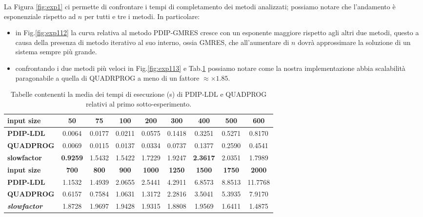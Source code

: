 La Figura \ref{fig:exp1} ci permette di confrontare i tempi di completamento dei metodi analizzati; possiamo notare che l'andamento è esponenziale rispetto ad $n$ per tutti e tre i metodi.
In particolare:
\begin{itemize}
    \item in Fig.\ref{fig:exp112} la curva relativa al metodo PDIP-GMRES cresce con un esponente maggiore rispetto agli altri due metodi, questo a causa della presenza di metodo iterativo al suo interno, ossia GMRES, che all'aumentare di $n$ dovrà approssimare la soluzione di un sistema sempre più grande.
    
    \item confrontando i due metodi più veloci in Fig.\ref{fig:exp113} e Tab.\ref{tab:ldlqp2} possiamo notare come la nostra implementazione abbia scalabilità paragonabile a quella di QUADRPROG a meno di un fattore $\approx\times1.85$.

\end{itemize}

\begin{table}[!h]
\centering
\begin{tabular}{|l|c|c|c|c|c|c|c|c|}
\hline \textbf{input size}                  & \textbf{50}  & \textbf{75}  & \textbf{100} & \textbf{200}  & \textbf{300}  & \textbf{400}  & \textbf{500}  & \textbf{600}  \\\hline
\textbf{PDIP-LDL}                    & 0.0064       & 0.0177       & 0.0211       & 0.0575        & 0.1418        & 0.3251        & 0.5271        & 0.8170        \\
\textbf{QUADPROG}                    & 0.0069       & 0.0115       & 0.0137       & 0.0334        & 0.0737        & 0.1377        & 0.2590        & 0.4541        \\
\textbf{slowfactor} & \textbf{0.9259}       & 1.5432       & 1.5422       & 1.7229        & 1.9247        & \textbf{2.3617}        & 2.0351        & 1.7989        \\ \hline
\textbf{input size}                  & \textbf{700} & \textbf{800} & \textbf{900} & \textbf{1000} & \textbf{1250} & \textbf{1500} & \textbf{1750} & \textbf{2000} \\\hline
\textbf{PDIP-LDL}                    & 1.1532       & 1.4939       & 2.0655       & 2.5441        & 4.2911        & 6.8573        & 8.8513        & 11.7768       \\
\textbf{QUADPROG}                    & 0.6157       & 0.7584       & 1.0631       & 1.3172        & 2.2816        & 3.5041        & 5.3935        & 7.9170        \\
\textbf{\textit{slowfactor}} & 1.8728       & 1.9697       & 1.9428       & 1.9315        & 1.8808        & 1.9569        & 1.6411        & 1.4875  \\\hline     
\end{tabular}
    \caption{Tabelle contenenti la media dei tempi di esecuzione (s) di PDIP-LDL e QUADPROG relativi al primo sotto-esperimento. \label{tab:ldlqp2}}
    \end{table}
   
